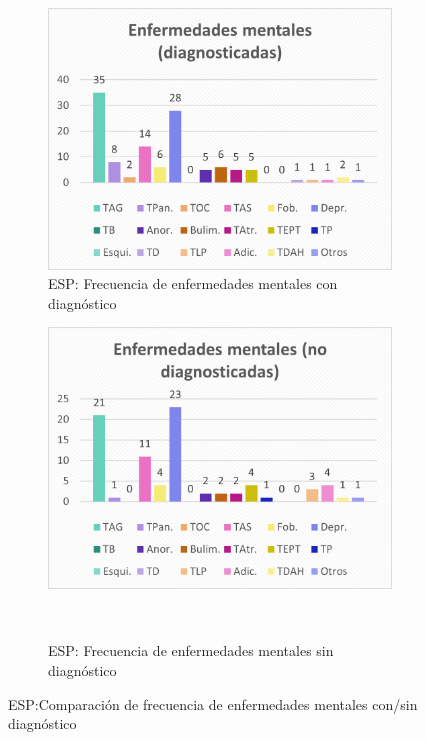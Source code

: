 \documentclass[12pt, a4paper,twoside,titlepage]{book}
\begin{document}
\begin{figure}
\centering
\begin{subfigure}{.5\textwidth}
  \centering
  \includegraphics[width=.95\linewidth]{ANEXO ESP/24AnexESPEnfdiag}
  \caption{ESP: Frecuencia de enfermedades mentales con diagnóstico}
\end{subfigure}%
\begin{subfigure}{.5\textwidth}
  \centering
  \includegraphics[width=.95\linewidth]{ANEXO ESP/25AnexESPEnfnodiag}
  \caption{ESP: Frecuencia de enfermedades mentales sin diagnóstico}  \
\end{subfigure}
\caption{ESP:Comparación de frecuencia de enfermedades mentales con/sin diagnóstico}
\label{fig:ESPTenidasdiag}
\end{figure}
\end{document}
